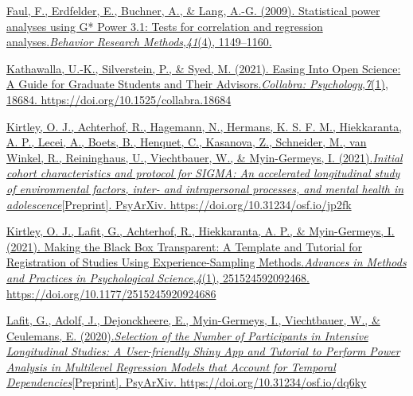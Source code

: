 \documentclass[
]{article}
\begin{document}
\href{https://www.zotero.org/google-docs/?EJLlNC}{Faul, F., Erdfelder,
E., Buchner, A., \& Lang, A.-G. (2009). Statistical power analyses using
G* Power 3.1: Tests for correlation and regression
analyses.}\href{https://www.zotero.org/google-docs/?EJLlNC}{\emph{Behavior
Research
Methods}}\href{https://www.zotero.org/google-docs/?EJLlNC}{,}\href{https://www.zotero.org/google-docs/?EJLlNC}{\emph{41}}\href{https://www.zotero.org/google-docs/?EJLlNC}{(4),
1149--1160.}

\href{https://www.zotero.org/google-docs/?EJLlNC}{Kathawalla, U.-K.,
Silverstein, P., \& Syed, M. (2021). Easing Into Open Science: A Guide
for Graduate Students and Their
Advisors.}\href{https://www.zotero.org/google-docs/?EJLlNC}{\emph{Collabra:
Psychology}}\href{https://www.zotero.org/google-docs/?EJLlNC}{,}\href{https://www.zotero.org/google-docs/?EJLlNC}{\emph{7}}\href{https://www.zotero.org/google-docs/?EJLlNC}{(1),
18684. https://doi.org/10.1525/collabra.18684}

\href{https://www.zotero.org/google-docs/?EJLlNC}{Kirtley, O. J.,
Achterhof, R., Hagemann, N., Hermans, K. S. F. M., Hiekkaranta, A. P.,
Lecei, A., Boets, B., Henquet, C., Kasanova, Z., Schneider, M., van
Winkel, R., Reininghaus, U., Viechtbauer, W., \& Myin-Germeys, I.
(2021).}\href{https://www.zotero.org/google-docs/?EJLlNC}{\emph{Initial
cohort characteristics and protocol for SIGMA: An accelerated
longitudinal study of environmental factors, inter- and intrapersonal
processes, and mental health in
adolescence}}\href{https://www.zotero.org/google-docs/?EJLlNC}{{[}Preprint{]}.
PsyArXiv. https://doi.org/10.31234/osf.io/jp2fk}

\href{https://www.zotero.org/google-docs/?EJLlNC}{Kirtley, O. J., Lafit,
G., Achterhof, R., Hiekkaranta, A. P., \& Myin-Germeys, I. (2021).
Making the Black Box Transparent: A Template and Tutorial for
Registration of Studies Using Experience-Sampling
Methods.}\href{https://www.zotero.org/google-docs/?EJLlNC}{\emph{Advances
in Methods and Practices in Psychological
Science}}\href{https://www.zotero.org/google-docs/?EJLlNC}{,}\href{https://www.zotero.org/google-docs/?EJLlNC}{\emph{4}}\href{https://www.zotero.org/google-docs/?EJLlNC}{(1),
251524592092468. https://doi.org/10.1177/2515245920924686}

\href{https://www.zotero.org/google-docs/?EJLlNC}{Lafit, G., Adolf, J.,
Dejonckheere, E., Myin-Germeys, I., Viechtbauer, W., \& Ceulemans, E.
(2020).}\href{https://www.zotero.org/google-docs/?EJLlNC}{\emph{Selection
of the Number of Participants in Intensive Longitudinal Studies: A
User-friendly Shiny App and Tutorial to Perform Power Analysis in
Multilevel Regression Models that Account for Temporal
Dependencies}}\href{https://www.zotero.org/google-docs/?EJLlNC}{{[}Preprint{]}.
PsyArXiv. https://doi.org/10.31234/osf.io/dq6ky}
\end{document}
